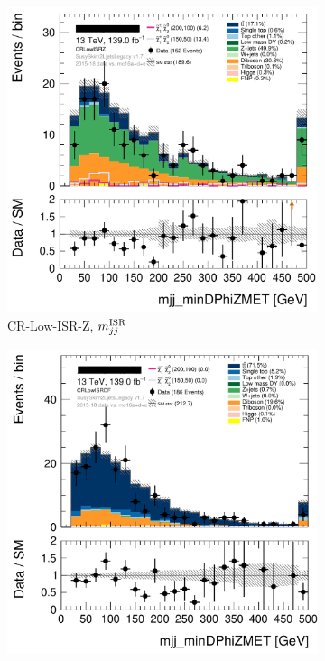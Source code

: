 \begin{figure}[tp]
\centering
\begin{subfigure}{0.48\textwidth}
\centering
\includegraphics[width=\textwidth]{figures/2ljets_vrlow_old_crlowisr_z.png}
\caption{CR-Low-ISR-Z, $m_{jj}^\mathrm{ISR}$}
\end{subfigure}
\hfill
\begin{subfigure}{0.48\textwidth}
\centering
\includegraphics[width=\textwidth]{figures/2ljets_vrlow_old_crlowisr_df.png}

\end{subfigure}
\end{figure}
